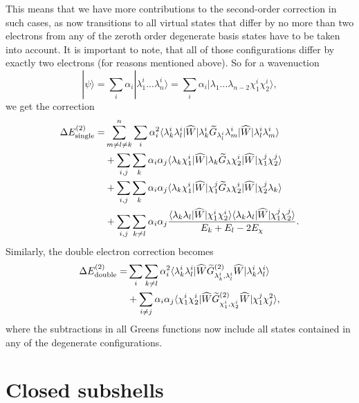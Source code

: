 	This means that we have more contributions to the second-order correction in such cases, as now transitions to all virtual states that differ by no more than two electrons from any of the zeroth order degenerate basis states have to be taken into account.  It is important to note, that all of those configurations differ by exactly two electrons (for reasons mentioned above). So for a wavenuction
	\begin{equation}
    |\psi\rangle = \sum_i \alpha_i |\lambda^i_1...\lambda^i_n \rangle = \sum_i \alpha_i |\lambda_1...\lambda_{n-2} \chi_1^i \chi_2^i \rangle,
\end{equation}
we get the correction
\begin{align}
    \Delta E^{(2)}_{\rm{single}} =& \sum_{m \neq l \neq k}^{n} \sum_i\alpha_i^2 \langle \lambda^i_k \lambda^i_l|\widehat{W} |\lambda^i_k \widetilde{G}_{\lambda^i_l} \lambda^i_m|\widehat{W}|\lambda^i_l \lambda^i_m \rangle \nonumber 
    \\
    &+\sum_{i,j}\sum_{k} \alpha_i \alpha_j\langle \lambda_k \chi^i_1|\widehat{W} |\lambda_k \widetilde{G}_{\lambda} \chi^i_2|\widehat{W}|\chi^j_1 \chi^j_2 \rangle \nonumber
    \\
    & + \sum_{i,j}\sum_{k} \alpha_i \alpha_j\langle \lambda_k \chi^i_1|\widehat{W} |\chi^j_1 \widetilde{G}_{\lambda} \chi^i_2|\widehat{W}|\chi^j_2 \lambda_k \rangle \nonumber 
    \\
    &+ \sum_{i,j}\sum_{k \neq l} \alpha_i \alpha_j \frac{\langle \lambda_k \lambda_l|\widehat{W} |\chi^i_1\chi^i_2 \rangle\langle \lambda_k \lambda_l |\widehat{W}|\chi^j_1 \chi^j_2 \rangle}{E_k+E_l-2E_{\chi}}.
\end{align}
Similarly, the double electron correction becomes
\begin{align}
    \Delta E^{(2)}_{\rm{double}} =& \sum_i \sum_{k \neq l} \alpha_i^2 \langle \lambda^i_k \lambda^i_l|\widehat{W} \widetilde{G}^{(2)}_{\lambda^i_k,\lambda^i_l} \widehat{W}|\lambda^i_k \lambda^i_l \rangle \nonumber \\
    &+ \sum_{i \neq j}  \alpha_i \alpha_j \langle \chi^i_1 \chi^i_2|\widehat{W} \widetilde{G}^{(2)}_{\chi^i_1,\chi^i_2} \widehat{W}|\chi^j_1 \chi_j^2 \rangle,
\end{align}
where the subtractions in all Greens functions now include all states contained in any of the degenerate configurations.


\section{Closed subshells}

